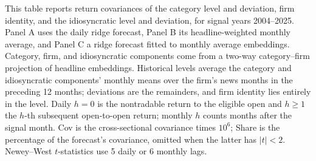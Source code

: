 \begin{table}[htbp]
\centering
\caption{Return Covariances of the Full Forecast Decomposition}
\label{tab:tabA_horizons}
\begin{minipage}{\linewidth}\footnotesize
This table reports return covariances of the category level and deviation, firm identity, and the idiosyncratic level and deviation, for signal years 2004--2025. Panel A uses the daily ridge forecast, Panel B its headline-weighted monthly average, and Panel C a ridge forecast fitted to monthly average embeddings. Category, firm, and idiosyncratic components come from a two-way category--firm projection of headline embeddings. Historical levels average the category and idiosyncratic components' monthly means over the firm's news months in the preceding 12 months; deviations are the remainders, and firm identity lies entirely in the level. Daily $h=0$ is the nontradable return to the eligible open and $h\ge1$ the $h$-th subsequent open-to-open return; monthly $h$ counts months after the signal month. Cov is the cross-sectional covariance times $10^6$; Share is the percentage of the forecast's covariance, omitted when the latter has $|t|<2$. Newey--West $t$-statistics use 5 daily or 6 monthly lags.
\end{minipage}
\medskip


\end{table}
